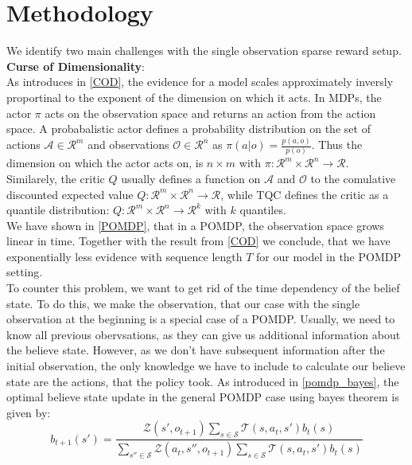 
\chapter{Methodology}
\label{chapter:Methodology}
We identify two main challenges with the single observation sparse reward setup. \\
\textbf{Curse of Dimensionality}:\\
As introduces in \ref{COD}, the evidence for a model scales approximately inversly proportinal to the exponent of the dimension on which it acts. In MDPs, the 
actor $\pi$ acts on the observation space and returns an action from the action space. A probabalistic actor defines a probability distribution on the set 
of actions $\mathcal{A} \in \mathcal{R}^m$ and observations $\mathcal{O} \in \mathcal{R}^n$ as $\pi(a|o) = \frac{p(a,o)}{p(o)}$. 
Thus the dimension on which the actor acts on, is $n \times m$ with $\pi:\mathcal{R}^m \times \mathcal{R}^n \rightarrow \mathcal{R}$.\\
Similarely, the critic $Q$ usually defines a function on $\mathcal{A}$ and $\mathcal{O}$ to the comulative discounted expected value 
$Q:\mathcal{R}^m \times \mathcal{R}^n \rightarrow \mathcal{R}$, while TQC defines the critic as a quantile distribution: 
$Q:\mathcal{R}^m \times \mathcal{R}^n \rightarrow \mathcal{R}^k$ with $k$ quantiles.\\
We have shown in \ref{POMDP}, that in a POMDP, the observation space grows linear in time. Together with the result from \ref{COD} we conclude, that we have 
exponentially less evidence with sequence length $T$ for our model in the POMDP setting.\\
To counter this problem, we want to get rid of the time dependency of the belief state. To do this, 
we make the observation, that our case with the single observation at the beginning is a special case of a POMDP. Usually, 
we need to know all previous obervsations, as they can give us additional information about the believe state. However, as we don't have subsequent information 
after the initial observation, the only knowledge we have to include to calculate our believe state are the actions, that the policy took. As introduced in \ref{pomdp_bayes}, the optimal believe state 
update in the general POMDP case using bayes theorem is given by:
\begin{equation}
    b_{t+1}(s') = \frac{\mathcal{Z}(s', o_{t+1}) \sum_{s \in \mathcal{S}} \mathcal{T}(s, a_t, s') b_t(s)}{\sum_{s'' \in \mathcal{S}} \mathcal{Z}(a_t, s'', o_{t+1}) \sum_{s \in \mathcal{S}} \mathcal{T}(s, a_t, s') b_t(s)}
\end{equation}
